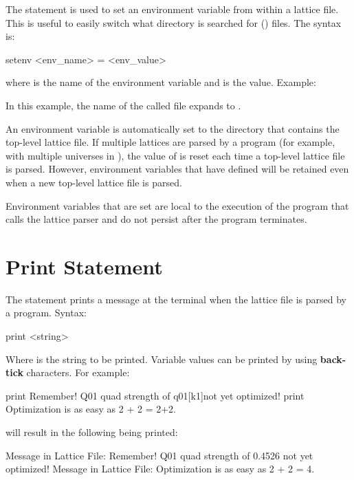 {{{{{The  statement is used to set an environment variable from within a lattice file.
This is useful to easily switch what directory is searched for  () files.
The syntax is:
\begin{example}
  setenv <env_name> = <env_value>
\end{example}
where  is the name of the environment variable and  is the value.
Example:
In this example, the name of the called file expands to .

An environment variable  is automatically set to the directory that contains
the top-level lattice file. If multiple lattices are parsed by a program (for example, with multiple
universes in \tao), the value of  is reset each time a top-level lattice file
is parsed. However, environment variables that have defined will be retained even when a new top-level
lattice file is parsed.

Environment variables that are set are local to the execution of the program that calls the lattice
parser and do not persist after the program terminates.

\section{Print Statement}
\label{s:print}

The  statement prints a message at the terminal when the 
lattice file is parsed by a program. Syntax:
\begin{example}
  print <string>
\end{example}
Where  is the string to be printed. Variable values can be printed by using
\textbf{back-tick} characters. For example:
\begin{example}
  print Remember! Q01 quad strength of \backtick{}q01[k1]\backtick not yet optimized!
  print Optimization is as easy as 2 + 2 = \backtick{}2+2\backtick.
\end{example}
will result in the following being printed:
\begin{example}
  Message in Lattice File: Remember! Q01 quad strength of 0.4526 not yet optimized!
  Message in Lattice File: Optimization is as easy as 2 + 2 = 4.
\end{example}

}}}}}
